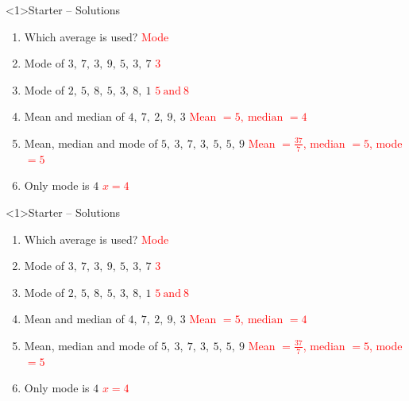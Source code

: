\documentclass{beamer}
\begin{document}
\begin{frame}<1>{Starter -- Solutions}
\vspace{-0.8em}

\footnotesize
\begin{enumerate}\itemsep2pt
  \item Which average is used?  
        \textcolor{red}{Mode}
  \item Mode of $3,\ 7,\ 3,\ 9,\ 5,\ 3,\ 7$  
        \textcolor{red}{$3$}
  \item Mode of $2,\ 5,\ 8,\ 5,\ 3,\ 8,\ 1$  
        \textcolor{red}{$5\ \text{and}\ 8$}
  \item Mean and median of $4,\ 7,\ 2,\ 9,\ 3$  
        \textcolor{red}{Mean $=5,\ \text{median }=4$}
  \item Mean, median and mode of $5,\ 3,\ 7,\ 3,\ 5,\ 5,\ 9$  
        \textcolor{red}{Mean $=\frac{37}{7}$, median $=5$, mode $=5$}
  \item Only mode is $4$  
        \textcolor{red}{$x=4$}
\end{enumerate}
\end{frame}
\begin{frame}<1>{Starter -- Solutions}
\vspace{-0.8em}

\footnotesize
\begin{enumerate}\itemsep2pt
  \item Which average is used?  
        \textcolor{red}{Mode}
  \item Mode of $3,\ 7,\ 3,\ 9,\ 5,\ 3,\ 7$  
        \textcolor{red}{$3$}
  \item Mode of $2,\ 5,\ 8,\ 5,\ 3,\ 8,\ 1$  
        \textcolor{red}{$5\ \text{and}\ 8$}
  \item Mean and median of $4,\ 7,\ 2,\ 9,\ 3$  
        \textcolor{red}{Mean $=5,\ \text{median }=4$}
  \item Mean, median and mode of $5,\ 3,\ 7,\ 3,\ 5,\ 5,\ 9$  
        \textcolor{red}{Mean $=\frac{37}{7}$, median $=5$, mode $=5$}
  \item Only mode is $4$  
        \textcolor{red}{$x=4$}
\end{enumerate}
\end{frame}
\end{document}
